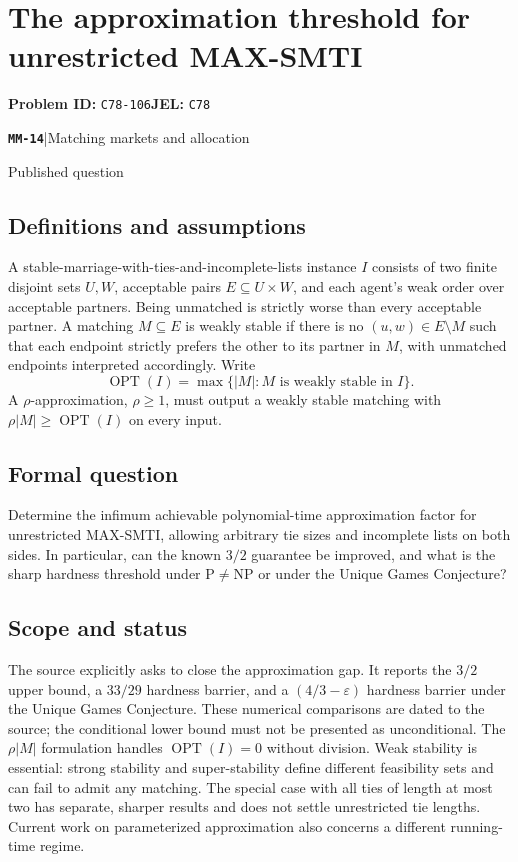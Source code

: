 \documentclass[11pt,a4paper]{article}
\newcommand{\entrymeta}[3]{{\sffamily\small\color{muted}\textbf{\texttt{#1}}\quad|\quad #2\par #3\par}}
\begin{document}
\section*{The approximation threshold for unrestricted MAX-SMTI}
\textbf{Problem ID:} \texttt{C78-106}\quad \textbf{JEL:} \texttt{C78}\par
\label{problem:OP-0555}
\label{beyond:MM-14}
\entrymeta{MM-14}{Matching markets and allocation}{Published question}
\subsection*{Definitions and assumptions}
A stable-marriage-with-ties-and-incomplete-lists instance $I$ consists of two finite disjoint sets $U,W$, acceptable pairs $E\subseteq U\times W$, and each agent's weak order over acceptable partners. Being unmatched is strictly worse than every acceptable partner. A matching $M\subseteq E$ is weakly stable if there is no $(u,w)\in E\setminus M$ such that each endpoint strictly prefers the other to its partner in $M$, with unmatched endpoints interpreted accordingly. Write
\[
 \operatorname{OPT}(I)=\max\{|M|:M\text{ is weakly stable in }I\}.
\]
A $\rho$-approximation, $\rho\ge1$, must output a weakly stable matching with $\rho|M|\ge\operatorname{OPT}(I)$ on every input.
\subsection*{Formal question}
Determine the infimum achievable polynomial-time approximation factor for unrestricted MAX-SMTI, allowing arbitrary tie sizes and incomplete lists on both sides. In particular, can the known $3/2$ guarantee be improved, and what is the sharp hardness threshold under $\mathrm P\ne\mathrm{NP}$ or under the Unique Games Conjecture?
\subsection*{Scope and status}
The source explicitly asks to close the approximation gap. It reports the $3/2$ upper bound, a $33/29$ hardness barrier, and a $(4/3-\varepsilon)$ hardness barrier under the Unique Games Conjecture. These numerical comparisons are dated to the source; the conditional lower bound must not be presented as unconditional. The $\rho|M|$ formulation handles $\operatorname{OPT}(I)=0$ without division. Weak stability is essential: strong stability and super-stability define different feasibility sets and can fail to admit any matching. The special case with all ties of length at most two has separate, sharper results and does not settle unrestricted tie lengths. Current work on parameterized approximation also concerns a different running-time regime.
\end{document}
